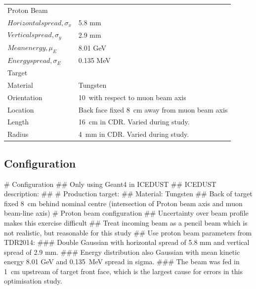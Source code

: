 \begin{table}[t]
\centering
\begin{tabular}{ll}
	\hline
	\multicolumn{2}{l}{Proton Beam}\\
	$Horizontal spread, \sigma_x$ & 5.8 mm \\
	$Vertical spread, \sigma_y$ & 2.9 mm \\
	$Mean energy, \mu_E$ & 8.01 GeV \\
	$Energy spread,\sigma_E$ & 0.135 MeV \\
	\hline
	\multicolumn{2}{l}{Target}\\
	Material & Tungsten  \\
	Orientation & 10~\degree with respect to muon beam axis    \\
	Location & Back face fixed 8~cm away from muon beam axis  \\
	Length & 16~cm in CDR. Varied during study.  \\
	Radius & 4~mm in CDR. Varied during study.  \\
\end{tabular}
\end{table}



\begin{easylist}
\end{easylist}
\subsection{Configuration} 
\begin{easylist}
# Configuration
## Only using Geant4 in ICEDUST
## ICEDUST description: 
## 
# Production target:
## Material: Tungsten
## Back of target fixed 8~cm behind nominal centre (intersection of Proton beam axis and muon beam-line axis)
# Proton beam configuration
## Uncertainty over beam profile makes this exercise difficult
## Treat incoming beam as a pencil beam which is not realistic, but reasonable for this study 
## Use proton beam parameters from TDR2014:
### Double Gaussian with horizontal spread of 5.8 mm and vertical spread of 2.9 mm.
### Energy distribution also Gaussian with mean kinetic energy 8.01 GeV and 0.135~MeV spread in sigma.
### The beam was fed in 1~cm upstream of target front face, which is the largest cause for errors in this optimisation study.
\end{easylist}

